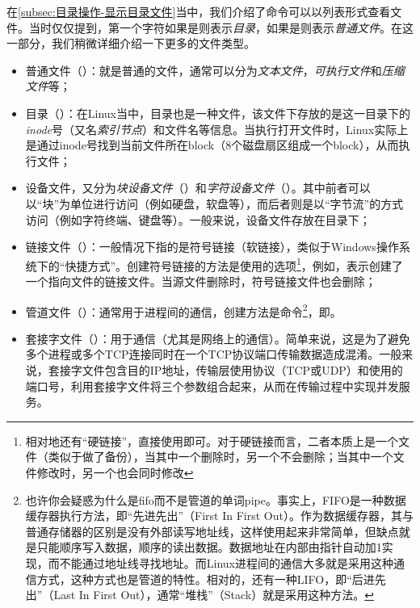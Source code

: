 \begin{extend}
    在\ref{subsec:目录操作-显示目录文件}当中，我们介绍了命令可以以列表形式查看文件。当时仅仅提到，第一个字符如果是则表示\emph{目录}，如果是\code{-}则表示\emph{普通文件}。在这一部分，我们稍微详细介绍一下更多的文件类型。

    \begin{itemize}
        \item 普通文件（\code{-}）：就是普通的文件，通常可以分为\emph{文本文件}，\emph{可执行文件}和\emph{压缩文件}等；
        \item 目录（）：在Linux当中，目录也是一种文件，该文件下存放的是这一目录下的\emph{inode}号（又名\emph{索引节点}）和文件名等信息。当执行打开文件时，Linux实际上是通过inode号找到当前文件所在block（8个磁盘扇区组成一个block），从而执行文件；
        \item 设备文件，又分为\emph{块设备文件}（）和\emph{字符设备文件}（）。其中前者可以以“块”为单位进行访问（例如硬盘，软盘等），而后者则是以“字节流”的方式访问（例如字符终端、键盘等）。一般来说，设备文件存放在目录下；
        \item 链接文件（）：一般情况下指的是符号链接（软链接），类似于Windows操作系统下的“快捷方式”。创建符号链接的方法是使用的选项\footnote{相对地还有“硬链接”，直接使用即可。对于硬链接而言，二者本质上是一个文件（类似于做了备份），当其中一个删除时，另一个不会删除；当其中一个文件修改时，另一个也会同时修改}，例如，表示创建了一个指向文件的链接文件。当源文件删除时，符号链接文件也会删除；
        \item 管道文件（）：通常用于进程间的通信，创建方法是命令\footnote{也许你会疑惑为什么是fifo而不是管道的单词pipe。事实上，FIFO是一种数据缓存器执行方法，即“先进先出”（First In First Out）。作为数据缓存器，其与普通存储器的区别是没有外部读写地址线，这样使用起来非常简单，但缺点就是只能顺序写入数据，顺序的读出数据。数据地址在内部由指针自动加1实现，而不能通过地址线寻找地址。而Linux进程间的通信大多就是采用这种通信方式，这种方式也是管道的特性。相对的，还有一种LIFO，即“后进先出”（Last In First Out），通常“堆栈”（Stack）就是采用这种方法。}，即。
        \item 套接字文件（）：用于通信（尤其是网络上的通信）。简单来说，这是为了避免多个进程或多个TCP连接同时在一个TCP协议端口传输数据造成混淆。一般来说，套接字文件包含目的IP地址，传输层使用协议（TCP或UDP）和使用的端口号，利用套接字文件将三个参数组合起来，从而在传输过程中实现并发服务。
    \end{itemize}
\end{extend}


